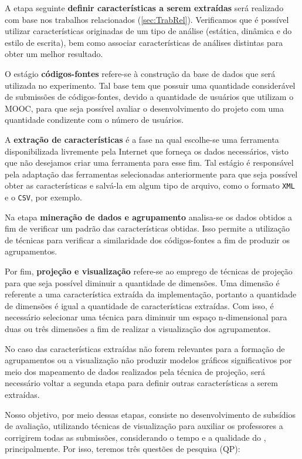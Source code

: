 	 	A etapa seguinte \textbf{definir características a serem extraídas} será realizado
	 	com base nos trabalhos relacionados (\cref{sec:TrabRel}). Verificamos que é
	 	possível utilizar características originadas de um tipo de análise (estática,
	 	dinâmica e do estilo de escrita), bem como associar características de análises
	 	distintas para obter um melhor resultado.
	 	
	 	O estágio \textbf{códigos-fontes} refere-se à construção da base de dados que será
	 	utilizada no experimento. Tal base tem que possuir uma quantidade considerável de
	 	submissões de códigos-fontes, devido a quantidade de usuários que utilizam o \acs{MOOC},
	 	para que seja possível avaliar o desenvolvimento do projeto com uma quantidade
	 	condizente com o número de usuários.
	 	
	 	A \textbf{extração de características} é a fase na qual escolhe-se uma ferramenta
	 	disponibilizada livremente pela Internet que forneça os dados necessários, visto
	 	que não desejamos criar uma ferramenta para esse fim. Tal estágio é responsável pela
	 	adaptação das ferramentas selecionadas anteriormente para que seja possível obter
	 	as características e salvá-la em algum tipo de arquivo, como o formato \texttt{XML}
	 	e o \texttt{CSV}, por exemplo.
	 	
	 	Na etapa \textbf{mineração de dados e agrupamento} analisa-se os dados obtidos a
	 	fim de verificar um padrão das características obtidas. Isso permite a utilização
	 	de técnicas para verificar a similaridade dos códigos-fontes a fim
	 	de produzir os agrupamentos.
	 	
	 	Por fim, \textbf{projeção e visualização} refere-se ao emprego de técnicas de
	 	projeção para que seja possível diminuir a quantidade de dimensões. Uma dimensão
	 	é referente a uma característica extraída da implementação, portanto a quantidade
	 	de dimensões é igual a quantidade de características extraídas. Com isso, é
	 	necessário selecionar uma técnica para diminuir um espaço n-dimensional para
	 	duas ou três dimensões a fim de realizar a visualização dos agrupamentos.
	 	
	 	No caso das características extraídas não forem relevantes para a formação de
	 	agrupamentos ou a visualização não produzir modelos gráficos significativos por
	 	meio dos mapeamento de dados realizados pela técnica de projeção, será necessário
	 	voltar a segunda etapa para definir outras características a serem extraídas.
	 	
	 	Nosso objetivo, por meio dessas etapas, consiste no desenvolvimento de subsídios
	 	de avaliação, utilizando técnicas de visualização para auxiliar os professores a
	 	corrigirem todas as submissões, considerando o tempo e a qualidade do ,
	 	principalmente. Por isso, teremos três questões de pesquisa (QP):
	 	

